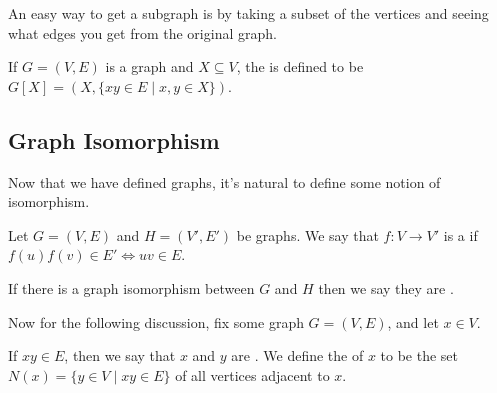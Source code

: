 \documentclass[a4paper]{scrreprt}
\begin{document}
An easy way to get a subgraph is by taking a subset of the vertices and seeing what edges you get from the original graph.

\begin{definition}
	If $G = (V, E)$ is a graph and $X \subseteq V$, the  is defined to be $G[X] = (X, \{xy \in E \mid x, y \in X\})$.
\end{definition}

\subsection{Graph Isomorphism}

Now that we have defined graphs, it's natural to define some notion of isomorphism.

\begin{definition}
	Let $G = (V, E)$ and $H = (V', E')$ be graphs. We say that $f : V \rightarrow V'$ is a  if $f(u)f(v) \in E' \iff uv \in E$. 

	If there is a graph isomorphism between $G$ and $H$ then we say they are .
\end{definition}

Now for the following discussion, fix some graph $G = (V, E)$, and let $x \in V$. 

\begin{definition}[Neighbourhood]
	If $xy \in E$, then we say that $x$ and $y$ are .
	We define the  of $x$ to be the set $N(x) = \{ y \in V \mid xy \in E\}$ of all vertices adjacent to $x$.
\end{definition}
\end{document}
